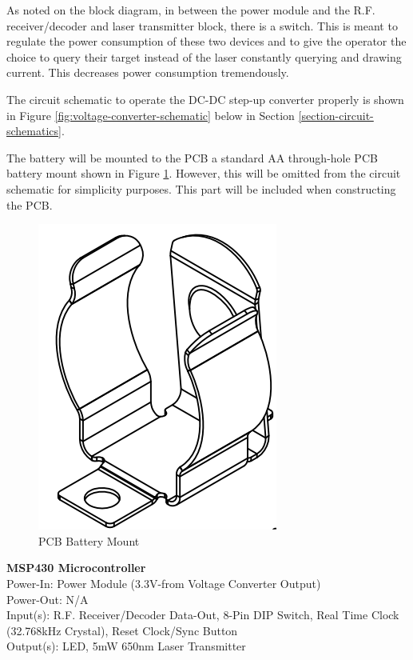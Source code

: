 \documentclass[letterpaper,10pt]{article}
\begin{document}
\begin{spacing}{1.15}
As noted on the block diagram, in between the power module and the R.F. receiver/decoder and laser transmitter block, there is a switch. This is meant to regulate the power consumption of these two devices and to give the operator the choice to query their target instead of the laser constantly querying and drawing current. This decreases power consumption tremendously.

The circuit schematic to operate the DC-DC step-up converter properly is shown in Figure \ref{fig:voltage-converter-schematic} below in Section \ref{section-circuit-schematics}.


The battery will be mounted to the PCB a standard AA through-hole PCB battery mount shown in Figure \ref{fig:pcb-battery-mount}. However, this will be omitted from the circuit schematic for simplicity purposes. This part will be included when constructing the PCB.
\begin{figure} [H]
	\centering
	\includegraphics[scale=0.4]{PCB_Battery_Mount.png}
	\caption{PCB Battery Mount\label{fig:pcb-battery-mount}}
\end{figure}

\normalsize\textbf{MSP430 Microcontroller} \\
Power-In: Power Module (3.3V-from Voltage Converter Output)\\
Power-Out: N/A\\
Input(s): R.F. Receiver/Decoder Data-Out, 8-Pin DIP Switch,  Real Time Clock (32.768kHz Crystal), Reset Clock/Sync Button\\
Output(s): LED, 5mW 650nm Laser Transmitter


\end{spacing}
\end{document}
